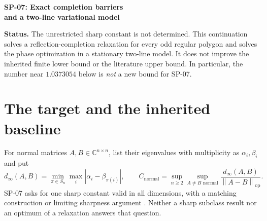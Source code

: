 \documentclass[11pt]{article}
\theoremstyle{remark}
\newcommand{\op}{\mathrm{op}}
\newcommand{\norm}[1]{\left\lVert#1\right\rVert_{\op}}
\newcommand{\Cstar}{C_{\mathrm{normal}}}
\begin{document}
\begin{center}
{\LARGE\bfseries SP-07: Exact completion barriers\\[4pt] and a two-line variational model}
\end{center}

\textbf{Status.} The unrestricted sharp constant is not determined. This continuation solves a reflection-completion relaxation for every odd regular polygon and solves the phase optimization in a stationary two-line model. It does not improve the inherited finite lower bound or the literature upper bound. In particular, the number near $1.0373054$ below is \emph{not} a new bound for SP-07.

\begin{abstract}
For a regular odd polygon of selected spectral values, we obtain an exact formula for the least anticommutator norm over all Hermitian-unitary completions of a prescribed circulant overlap. A norm-preserving orbit dilation removes the circulant assumption from the resulting obstruction: whenever the selected compression has an eigenvalue $+1$ or $-1$, the selected pair-sum separation cannot exceed the full anticommutator norm. Thus this geometry cannot produce a greater-than-one selected Hall quotient, in arbitrary completion dimension.

An explicit sequence of compressed optima has quotient tending to $\pi/2$, while its best completed selected quotient tends to zero. Separately, a bounded anticommutator of an unbounded normal two-line operator reduces to a scalar speed-control problem with an exact integral solution. Rational arithmetic certifies its formal selected quotient at one parameter pair between $1.0373054176426$ and $1.0373054176428$. An explicit infinite matching, however, has a ratio below one. This identifies the finite Hall deficit and its boundary realization as essential missing ingredients, rather than silently transferring an infinite or compressed optimum to SP-07.
\end{abstract}

\section{The target and the inherited baseline}
For normal matrices $A,B\in\mathbb C^{n\times n}$, list their eigenvalues with multiplicity as $\alpha_i,\beta_i$ and put
\[
 d_\infty(A,B)=\min_{\pi\in S_n}\max_i|\alpha_i-\beta_{\pi(i)}|,
 \qquad
 \Cstar=\sup_{n\ge2}\sup_{A\ne B\text{ normal}}
 \frac{d_\infty(A,B)}{\norm{A-B}}.
\]
SP-07 asks for one sharp constant valid in all dimensions, with a matching construction or limiting sharpness argument \cite{sp07}. Neither a sharp subclass result nor an optimum of a relaxation answers that question.
\end{document}
